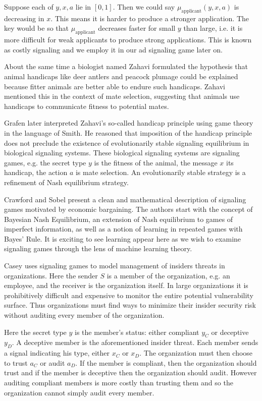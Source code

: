 \documentclass{article}
\begin{document}
Suppose each of $y, x, a$ lie in $[0,1]$. Then we could say $\mu_{\text{applicant}}(y, x, a)$ is decreasing in $x$. This means it is harder to produce a stronger application. The key would be so that $\mu_{\text{applicant}}$ decreases faster for small $y$ than large, i.e. it is more difficult for weak applicants to produce strong applications. This is known as costly signaling and we employ it in our ad signaling game later on.

About the same time a biologist named Zahavi \cite{zahavi1} formulated the hypothesis that animal handicaps like deer antlers and peacock plumage could be explained because fitter animals are better able to endure such handicaps. Zahavi mentioned this in the context of mate selection, suggesting that animals use handicaps to communicate fitness to potential mates.

Grafen\cite{grafen1} later interpreted Zahavi's so-called handicap principle using game theory in the language of Smith\cite{smith1982evolution}. He reasoned that imposition of the handicap principle does not preclude the existence of evolutionarily stable signaling equilibrium in biological signaling systems. These biological signaling systems are signaling games, e.g. the secret type $y$ is the fitness of the animal, the message $x$ its handicap, the action $a$ is mate selection. An evolutionarily stable strategy is a refinement of Nash equilibrium strategy.

Crawford and Sobel\cite{crawford1982strategic} present a clean and mathematical description of signaling games motivated by economic bargaining. The authors start with the concept of Bayesian Nash Equilibrium, an extension of Nash equilibrium to games of imperfect information, as well as a notion of learning in repeated games with Bayes' Rule. It is exciting to see learning appear here as we wish to examine signaling games through the lens of machine learning theory.

Casey\cite{casey1} uses signaling games to model management of insiders threats in organizations. Here the sender $S$ is a member of the organization, e.g. an employee, and the receiver is the organization itself. In large organizations it is prohibitively difficult and expensive to monitor the entire potential vulnerability surface. Thus organizations must find ways to minimize their insider security risk without auditing every member of the organization.

Here the secret type $y$ is the member's status: either compliant $y_C$ or deceptive $y_D$. A deceptive member is the aforementioned insider threat. Each member sends a signal indicating his type, either $x_C$ or $x_D$. The organization must then choose to trust $a_C$ or audit $a_D$. If the member is compliant, then the organization should trust and if the member is deceptive then the organization should audit. However auditing compliant members is more costly than trusting them and so the organization cannot simply audit every member.
\end{document}
